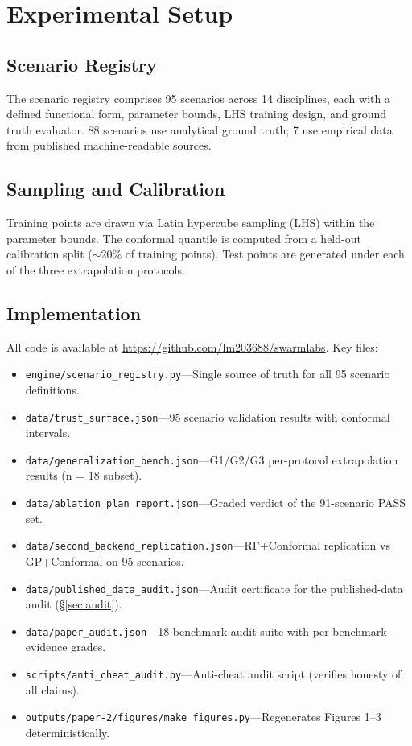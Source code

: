 \documentclass[journal]{IEEEtran}
\begin{document}
\section{Experimental Setup}
\label{sec:setup}

\subsection{Scenario Registry}

The scenario registry comprises 95 scenarios across 14 disciplines, each with
a defined functional form, parameter bounds, LHS training design, and ground
truth evaluator. 88 scenarios use analytical ground truth; 7 use empirical
data from published machine-readable sources.

\subsection{Sampling and Calibration}

Training points are drawn via Latin hypercube sampling (LHS) within the
parameter bounds. The conformal quantile is computed from a held-out
calibration split ($\sim$20\% of training points). Test points are generated
under each of the three extrapolation protocols.

\subsection{Implementation}

All code is available at \url{https://github.com/lm203688/swarmlabs}. Key
files:

\begin{itemize}
    \item \texttt{engine/scenario_registry.py}---Single source of truth for all
    95 scenario definitions.
    \item \texttt{data/trust_surface.json}---95 scenario validation results
    with conformal intervals.
    \item \texttt{data/generalization_bench.json}---G1/G2/G3 per-protocol
    extrapolation results (n = 18 subset).
    \item \texttt{data/ablation_plan_report.json}---Graded verdict of the
    91-scenario PASS set.
    \item \texttt{data/second_backend_replication.json}---RF+Conformal
    replication vs GP+Conformal on 95 scenarios.
    \item \texttt{data/published_data_audit.json}---Audit certificate for the
    published-data audit (§\ref{sec:audit}).
    \item \texttt{data/paper_audit.json}---18-benchmark audit suite with
    per-benchmark evidence grades.
    \item \texttt{scripts/anti_cheat_audit.py}---Anti-cheat audit script
    (verifies honesty of all claims).
    \item \texttt{outputs/paper-2/figures/make_figures.py}---Regenerates
    Figures 1--3 deterministically.
\end{itemize}
\end{document}
